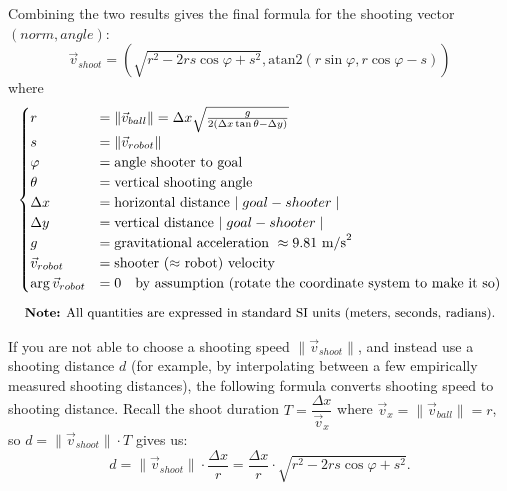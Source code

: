 \documentclass[11pt]{report}
\begin{document}
Combining the two results gives the final formula for the shooting vector $(norm, angle)$:
\[
	\boxed{
		\vec{v}_{shoot} = \left(
		\sqrt{r^2 - 2rs\cos\varphi + s^2}, \mathrm{atan2}\left(r\sin\varphi, r\cos \varphi - s\right)
		\right)
	}
\]
where
\[
	\begin{gathered}
		\begin{cases}
			r                    & = \|\vec{v}_{ball}\| = \Delta x \sqrt{\frac{g}{2 (\Delta x \tan\theta - \Delta y)}} \\
			s                    & = \|\vec{v}_{robot}\|                                                               \\
			\varphi              & = \text{angle shooter to goal}                                                      \\
			\theta               & = \text{vertical shooting angle}                                                    \\
			\Delta x             & = \text{horizontal distance $\mid goal - shooter \mid$}                             \\
			\Delta y             & = \text{vertical distance $\mid goal - shooter \mid$}                               \\
			g                    & = \text{gravitational acceleration } \approx 9.81 \text{ m/s}^2                     \\
			\vec{v}_{robot}      & = \text{shooter ($\approx$ robot) velocity}                                         \\
			\arg \vec{v}_{robot} & = 0 \quad\text{by assumption (rotate the coordinate system to make it so)}          \\
		\end{cases} \\[1ex]
		\text{\small \textbf{Note:} All quantities are expressed in standard SI units (meters, seconds, radians).}
	\end{gathered}
\]

If you are not able to choose a shooting speed $\|\vec{v}_{shoot}\|$, and instead use a shooting distance $d$ (for example, by interpolating between a few empirically measured shooting distances), the following formula converts shooting speed to shooting distance. Recall the shoot duration $T = \dfrac{\Delta x}{\vec{v}_x}$ where $\vec{v}_x = \|\vec{v}_{ball}\|=r$, so $d = \|\vec{v}_{shoot}\| \cdot T$ gives us:
\[
	\boxed{
		d = \|\vec{v}_{shoot}\| \cdot \frac{\Delta x}{r} = \frac{\Delta x}{r} \cdot \sqrt{r^2 - 2rs\cos\varphi + s^2}
	}.
\]
\end{document}
